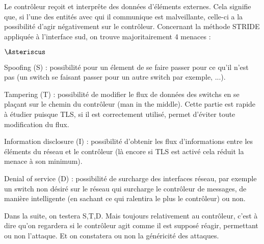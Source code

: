 Le contrôleur reçoit et interprête des données d'éléments externes. Cela signifie que, si l'une des entités avec qui il communique est malveillante, celle-ci a la possibilité d'agir négativement sur le contrôleur.
Concernant la méthode STRIDE appliquée à l'interface sud, on trouve majoritairement 4 menaces :

\begin{list}{$\Asteriscus$}{}

\item Spoofing (S) : possibilité pour un élement de se faire passer pour ce qu’il n’est pas (un switch se faisant passer pour un autre switch par exemple, ...).

\item Tampering (T) : possibilité de modifier le flux de données des switchs en se plaçant sur le chemin du contrôleur (man in the middle). Cette partie est rapide à étudier puisque TLS, si il est correctement utilisé, permet d’éviter toute modification du flux.

\item Information disclosure (I) : possibilité d’obtenir les flux d’informations entre les éléments du réseau et le contrôleur (là encore si TLS est activé cela réduit la menace à son minimum).

\item Denial of service (D) : possibilité de surcharge des interfaces réseau, par exemple un switch non désiré sur le réseau qui surcharge le contrôleur de messages, de manière intelligente (en sachant ce qui ralentira le plus le contrôleur) ou non.

\end{list}

Dans la suite, on testera S,T,D. Mais toujours relativement au contrôleur, c'est à dire qu'on regardera si le contrôleur agit comme il est supposé réagir, permettant ou non l'attaque. Et on constatera ou non la généricité des attaques.
